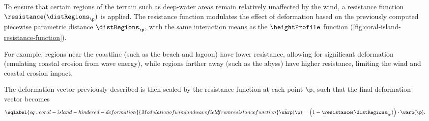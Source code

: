 To ensure that certain regions of the terrain such as deep-water areas remain relatively unaffected by the wind, a resistance function $\resistance(\distRegions_\p)$ is applied. The resistance function modulates the effect of deformation based on the previously computed piecewise parametric distance $\distRegions_\p$, with the same interaction means as the $\heightProfile$ function (\cref{fig:coral-island-resistance-function}).

For example, regions near the coastline (such as the beach and lagoon) have lower resistance, allowing for significant deformation (emulating coastal erosion from wave energy), while regions farther away (such as the abyss) have higher resistance, limiting the wind and coastal erosion impact.

The deformation vector previously described is then scaled by the resistance function at each point $\p$, such that the final deformation vector becomes
\begin{align}
    \eqlabel{eq:coral-island-hindered-deformation}{Modulation of wind and wave field from resistance function}
    \Tilde{\warp}(\p) = \left(1 - \resistance(\distRegions_\p) \right) \cdot \warp(\p).
\end{align}

